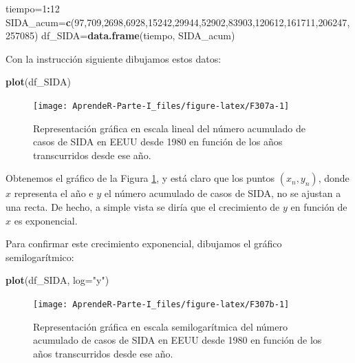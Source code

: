 \documentclass[]{book}
\newenvironment{Shaded}{\begin{snugshade}}{\end{snugshade}}
\newcommand{\DataTypeTok}[1]{\textcolor[rgb]{0.13,0.29,0.53}{#1}}
\newcommand{\DecValTok}[1]{\textcolor[rgb]{0.00,0.00,0.81}{#1}}
\newcommand{\KeywordTok}[1]{\textcolor[rgb]{0.13,0.29,0.53}{\textbf{#1}}}
\newcommand{\NormalTok}[1]{#1}
\newcommand{\OperatorTok}[1]{\textcolor[rgb]{0.81,0.36,0.00}{\textbf{#1}}}
\newcommand{\StringTok}[1]{\textcolor[rgb]{0.31,0.60,0.02}{#1}}
\theoremstyle{definition}
\theoremstyle{definition}
\theoremstyle{definition}
\theoremstyle{remark}
\begin{document}
\begin{Shaded}
\begin{Highlighting}[]
\NormalTok{tiempo=}\DecValTok{1}\OperatorTok{:}\DecValTok{12}
\NormalTok{SIDA_acum=}\KeywordTok{c}\NormalTok{(}\DecValTok{97}\NormalTok{,}\DecValTok{709}\NormalTok{,}\DecValTok{2698}\NormalTok{,}\DecValTok{6928}\NormalTok{,}\DecValTok{15242}\NormalTok{,}\DecValTok{29944}\NormalTok{,}\DecValTok{52902}\NormalTok{,}\DecValTok{83903}\NormalTok{,}\DecValTok{120612}\NormalTok{,}\DecValTok{161711}\NormalTok{,}\DecValTok{206247}\NormalTok{,}\DecValTok{257085}\NormalTok{)}
\NormalTok{df_SIDA=}\KeywordTok{data.frame}\NormalTok{(tiempo, SIDA_acum)}
\end{Highlighting}
\end{Shaded}

Con la instrucción siguiente dibujamos estos datos:

\begin{Shaded}
\begin{Highlighting}[]
\KeywordTok{plot}\NormalTok{(df_SIDA)}
\end{Highlighting}
\end{Shaded}

\begin{figure}

{\centering \texttt{[image: AprendeR-Parte-I\_files/figure-latex/F307a-1]} 

}

\caption{Representación gráfica en escala lineal  del número acumulado de casos de SIDA en EEUU desde 1980 en función de los años transcurridos desde ese año.}\label{fig:F307a}
\end{figure}

Obtenemos el gráfico de la Figura \ref{fig:F307a}, y está claro que los puntos \((x_n,y_n)\), donde \(x\) representa el año e \(y\) el número acumulado de casos de SIDA, no se ajustan a una recta. De hecho, a simple vista se diría que el crecimiento de \(y\) en función de \(x\) es exponencial.

Para confirmar este crecimiento exponencial, dibujamos el gráfico semilogarítmico:

\begin{Shaded}
\begin{Highlighting}[]
\KeywordTok{plot}\NormalTok{(df_SIDA, }\DataTypeTok{log=}\StringTok{"y"}\NormalTok{)}
\end{Highlighting}
\end{Shaded}

\begin{figure}

{\centering \texttt{[image: AprendeR-Parte-I\_files/figure-latex/F307b-1]} 

}

\caption{Representación gráfica en escala semilogarítmica  del número acumulado de casos de SIDA en EEUU desde 1980 en función de los años transcurridos desde ese año.}\label{fig:F307b}
\end{figure}
\end{document}
